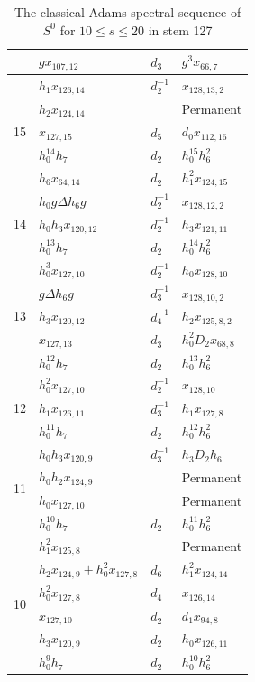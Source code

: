 \documentclass{amsart}
\numberwithin{equation}{section}
\begin{document}
\begin{table}
{\begin{tabular}{|c|l|l|l|}
 & $gx_{107,12}$ & $d_{3}$ & $g^3x_{66,7}$ \\\hline\hline
\multirow{5}{*}{15} & $h_1x_{126,14}$ & $d_{2}^{-1}$ & $x_{128,13,2}$ \\\cline{2-4}
 & $h_2x_{124,14}$ & & Permanent \\\cline{2-4}
 & $x_{127,15}$ & $d_{5}$ & $d_0x_{112,16}$ \\\cline{2-4}
 & $h_0^{14}h_7$ & $d_{2}$ & $h_0^{15}h_6^2$ \\\cline{2-4}
 & $h_6x_{64,14}$ & $d_{2}$ & $h_1^2x_{124,15}$ \\\hline\hline
\multirow{3}{*}{14} & $h_0g\Delta h_6g$ & $d_{2}^{-1}$ & $x_{128,12,2}$ \\\cline{2-4}
 & $h_0h_3x_{120,12}$ & $d_{2}^{-1}$ & $h_3x_{121,11}$ \\\cline{2-4}
 & $h_0^{13}h_7$ & $d_{2}$ & $h_0^{14}h_6^2$ \\\hline\hline
\multirow{5}{*}{13} & $h_0^3x_{127,10}$ & $d_{2}^{-1}$ & $h_0x_{128,10}$ \\\cline{2-4}
 & $g\Delta h_6g$ & $d_{3}^{-1}$ & $x_{128,10,2}$ \\\cline{2-4}
 & $h_3x_{120,12}$ & $d_{4}^{-1}$ & $h_2x_{125,8,2}$ \\\cline{2-4}
 & $x_{127,13}$ & $d_{3}$ & $h_0^2D_2x_{68,8}$ \\\cline{2-4}
 & $h_0^{12}h_7$ & $d_{2}$ & $h_0^{13}h_6^2$ \\\hline\hline
\multirow{3}{*}{12} & $h_0^2x_{127,10}$ & $d_{2}^{-1}$ & $x_{128,10}$ \\\cline{2-4}
 & $h_1x_{126,11}$ & $d_{3}^{-1}$ & $h_1x_{127,8}$ \\\cline{2-4}
 & $h_0^{11}h_7$ & $d_{2}$ & $h_0^{12}h_6^2$ \\\hline\hline
\multirow{4}{*}{11} & $h_0h_3x_{120,9}$ & $d_{3}^{-1}$ & $h_3D_2h_6$ \\\cline{2-4}
 & $h_0h_2x_{124,9}$ & & Permanent \\\cline{2-4}
 & $h_0x_{127,10}$ & & Permanent \\\cline{2-4}
 & $h_0^{10}h_7$ & $d_{2}$ & $h_0^{11}h_6^2$ \\\hline\hline
\multirow{6}{*}{10} & $h_1^2x_{125,8}$ & & Permanent \\\cline{2-4}
 & $h_2x_{124,9}+h_0^2x_{127,8}$ & $d_{6}$ & $h_1^2x_{124,14}$ \\\cline{2-4}
 & $h_0^2x_{127,8}$ & $d_{4}$ & $x_{126,14}$ \\\cline{2-4}
 & $x_{127,10}$ & $d_{2}$ & $d_1x_{94,8}$ \\\cline{2-4}
 & $h_3x_{120,9}$ & $d_{2}$ & $h_0x_{126,11}$ \\\cline{2-4}
 & $h_0^9h_7$ & $d_{2}$ & $h_0^{10}h_6^2$ \\\hline
  \end{tabular}}
\caption{The classical Adams spectral sequence of $S^0$ for $10 \le s \le 20$ in stem 127}
\label{Table:S127.20}
\end{table}
\end{document}
